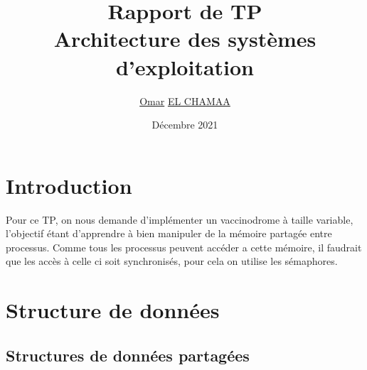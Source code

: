 \documentclass[a4paper]{article}
\title{Rapport de TP \\ Architecture des systèmes d'exploitation}
\author{\underline{Omar} \underline{EL CHAMAA}}
\date{Décembre 2021}
\makeatletter
\newenvironment{expl}{%
  \begin{list}{}{%
      \small\itshape%
      \topsep\z@%
      \listparindent0pt%
      \parsep0.75\baselineskip%
      \setlength{\leftmargin}{20mm}%
      \setlength{\rightmargin}{20mm}%
    }
  \item[]}%
  {\end{list}}
\makeatother
\begin{document}
\maketitle

\tableofcontents



\section{Introduction}

\begin{expl}
\setlength{\parindent}{10ex}
  
  
  Pour ce TP, on nous demande d'implémenter un vaccinodrome à taille variable, l'objectif étant d'apprendre à bien manipuler de la mémoire partagée entre processus. 
  Comme tous les processus peuvent accéder a cette mémoire, il faudrait que les accès à celle ci soit synchronisés, pour cela on utilise les sémaphores.
\end{expl}

\section{Structure de données}

\subsection{Structures de données partagées}\label{sec-shm}
\end{document}

